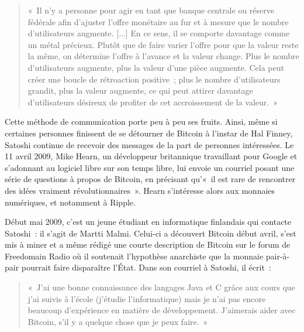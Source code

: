 \begin{quote}
«~Il n'y a personne pour agir en tant que banque centrale ou réserve fédérale afin d'ajuster l'offre monétaire au fur et à mesure que le nombre d'utilisateurs augmente. [...] En ce sens, il se comporte davantage comme un métal précieux. Plutôt que de faire varier l'offre pour que la valeur reste la même, on détermine l'offre à l'avance et la valeur change. Plus le nombre d'utilisateurs augmente, plus la valeur d'une pièce augmente. Cela peut créer une boucle de rétroaction positive~; plus le nombre d'utilisateurs grandit, plus la valeur augmente, ce qui peut attirer davantage d'utilisateurs désireux de profiter de cet accroissement de la valeur.~»
\end{quote}


Cette méthode de communication porte peu à peu ses fruits. Ainsi, même si certaines personnes finissent de se détourner de Bitcoin à l'instar de Hal Finney, Satoshi continue de recevoir des messages de la part de personnes intéressées. Le 11 avril 2009, Mike Hearn, un développeur britannique travaillant pour Google et s'adonnant au logiciel libre sur son temps libre, lui envoie un courriel posant une série de questions à propos de Bitcoin, en précisant qu'«~il est rare de rencontrer des idées vraiment révolutionnaires~». Hearn s'intéresse alors aux monnaies numériques, et notamment à Ripple.

Début mai 2009, c'est un jeune étudiant en informatique finlandais qui contacte Satoshi~: il s'agit de Martti Malmi. Celui-ci a découvert Bitcoin début avril, s'est mis à miner et a même rédigé une courte description de Bitcoin sur le forum de Freedomain Radio où il soutenait l'hypothèse anarchiste que la monnaie pair-à-pair pourrait faire disparaître l'État. Dans son courriel à Satoshi, il écrit~:

\begin{quote}
«~J'ai une bonne connaissance des langages Java et C grâce aux cours que j'ai suivis à l'école (j'étudie l'informatique) mais je n'ai pas encore beaucoup d'expérience en matière de développement. J'aimerais aider avec Bitcoin, s'il y a quelque chose que je peux faire.~»
\end{quote}

